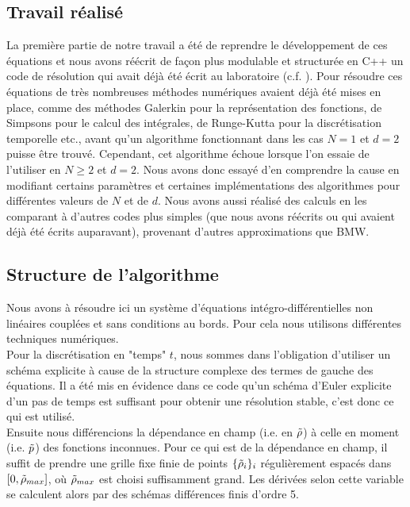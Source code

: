 \documentclass[10.5pt]{article}
\begin{document}
\begin{multicols*}{2}
\label{sec:NumContinu}

\subsection{Travail réalisé}


La première partie de notre travail a été de reprendre le développement de ces équations et nous avons réécrit de façon plus modulable et structurée en C++ un code de résolution qui avait déjà été écrit au laboratoire (c.f. ). Pour résoudre ces équations de très nombreuses méthodes numériques avaient déjà été mises en place, comme des méthodes Galerkin \cite{shen1994efficient, LeonardThesis} pour la représentation des fonctions, de Simpsons pour le calcul des intégrales, de Runge-Kutta pour la discrétisation temporelle etc., avant qu'un algorithme fonctionnant dans les cas $N=1$ et $d=2$ puisse être trouvé. Cependant, cet algorithme échoue lorsque l'on essaie de l'utiliser en $N \ge 2$ et $d=2$. Nous avons donc essayé d'en comprendre la cause en modifiant certains paramètres et certaines implémentations des algorithmes pour différentes valeurs de $N$ et de $d$. Nous avons aussi réalisé des calculs en les comparant à d'autres codes plus simples (que nous avons réécrits ou qui avaient déjà été écrits auparavant), provenant d'autres approximations que BMW. 


\subsection{Structure de l'algorithme}

Nous avons à résoudre ici un système d'équations intégro-différentielles non linéaires couplées et sans conditions au bords. Pour cela nous utilisons différentes techniques numériques. \\

Pour la discrétisation en "temps" $t$, nous sommes dans l'obligation d'utiliser un schéma explicite à cause de la structure complexe des termes de gauche des équations. Il a été mis en évidence dans ce code qu'un schéma d'Euler explicite d'un pas de temps est suffisant pour obtenir une résolution stable, c'est donc ce qui est utilisé. \\

Ensuite nous différencions la dépendance en champ (i.e. en $\tilde{\rho}$) à celle en moment (i.e. $\tilde{p}$) des fonctions inconnues. Pour ce qui est de la dépendance en champ, il suffit de prendre une grille fixe finie de points $\{ \tilde{\rho}_i \}_i$ régulièrement espacés dans $[0, \tilde{\rho}_{max}]$, où $\tilde{\rho}_{max}$ est choisi suffisamment grand. Les dérivées selon cette variable se calculent alors par des schémas différences finis d'ordre 5. \\


\end{multicols*}
\end{document}
